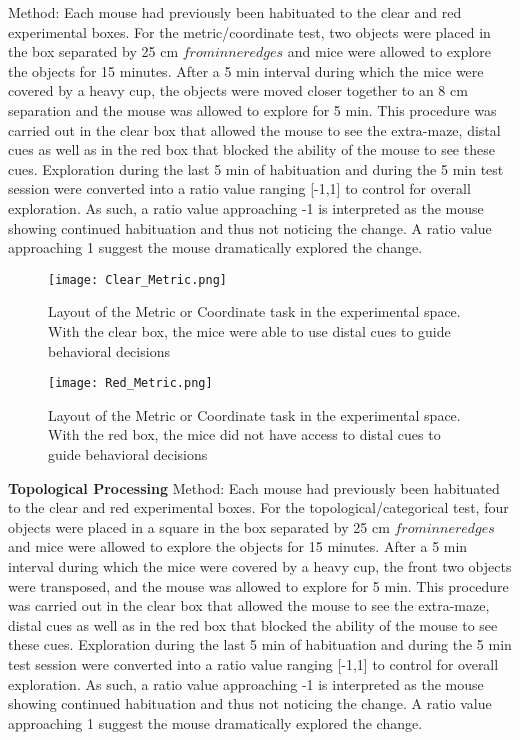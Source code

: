 \documentclass{article}
\begin{document}
Method:
Each mouse had previously been habituated to the clear and red experimental boxes. For the metric/coordinate test, two objects were placed in the box separated by 25 cm \(from inner edges\) and mice were allowed to explore the objects for 15 minutes. After a 5 min interval during which the mice were covered by a heavy cup, the objects were moved closer together to an 8 cm separation and the mouse was allowed to explore for 5 min. This procedure was carried out in the clear box that allowed the mouse to see the extra-maze, distal cues as well as in the red box that blocked the ability of the mouse to see these cues. Exploration during the last 5 min of habituation and during the 5 min test session were converted into a ratio value ranging [-1,1] to control for overall exploration. As such, a ratio value approaching -1 is interpreted as the mouse showing continued habituation and thus not noticing the change. A ratio value approaching 1 suggest the mouse dramatically explored the change.

\begin{figure}[h!]
\centering
\texttt{[image: Clear\_Metric.png]}
\caption{Layout of the Metric or Coordinate task in the experimental space. With the clear box, the mice were able to use distal cues to guide behavioral decisions}
\label{fig:Metric}
\end{figure}

\begin{figure}[h!]
\centering
\texttt{[image: Red\_Metric.png]}
\caption{Layout of the Metric or Coordinate task in the experimental space. With the red box, the mice did not have access to distal cues to guide behavioral decisions}
\label{fig:Metric}
\end{figure}

\textbf{Topological Processing}
Method:
Each mouse had previously been habituated to the clear and red experimental boxes. For the topological/categorical test, four objects were placed in a square in the box separated by 25 cm \(from inner edges\) and mice were allowed to explore the objects for 15 minutes. After a 5 min interval during which the mice were covered by a heavy cup, the front two objects were transposed, and the mouse was allowed to explore for 5 min. This procedure was carried out in the clear box that allowed the mouse to see the extra-maze, distal cues as well as in the red box that blocked the ability of the mouse to see these cues. Exploration during the last 5 min of habituation and during the 5 min test session were converted into a ratio value ranging [-1,1] to control for overall exploration. As such, a ratio value approaching -1 is interpreted as the mouse showing continued habituation and thus not noticing the change. A ratio value approaching 1 suggest the mouse dramatically explored the change.
\end{document}
